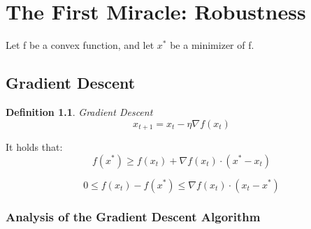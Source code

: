\documentclass[11pt]{book} %
\newtheorem{definition}{Definition}[section]
\begin{document}


\chapter{The First Miracle: Robustness}

Let f be a convex function, and let $x^*$ be a minimizer of f. 

\section{Gradient Descent}
\begin{definition}{Gradient Descent} \\
    \begin{equation}
       x_{t+1} = x_t - \eta \nabla f(x_t) 
    \end{equation}
\end{definition}

It holds that:
\begin{equation}
    f(x^*) \geq f(x_t) + \nabla f(x_t) \cdot (x^* - x_t)
\end{equation}

\begin{equation}
    0 \leq f(x_t) - f(x^*) \leq \nabla f(x_t) \cdot (x_t - x^*) 
\end{equation}

\subsection{Analysis of the Gradient Descent Algorithm}
\end{document}
